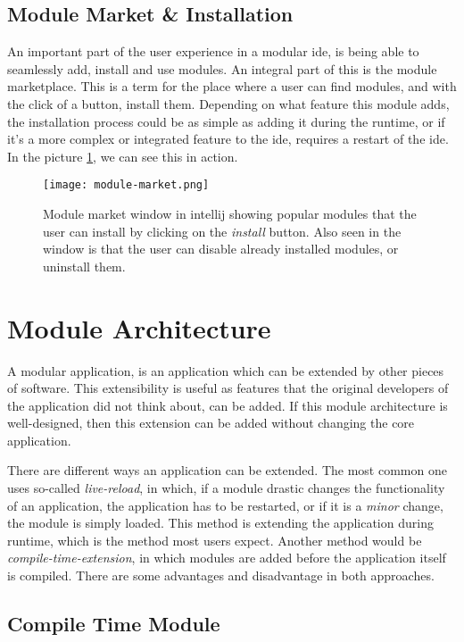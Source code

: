 \subsection{Module Market \& Installation}

An important part of the user experience in a modular \gls{ide}, is being able
to seamlessly add, install and use modules. An integral part of this is the
module marketplace. This is a term for the place where a user can find modules,
and with the click of a button, install them. Depending on what feature this
module adds, the installation process could be as simple as adding it during the
runtime, or if it's a more complex or integrated feature to the \gls{ide},
requires a restart of the \gls{ide}. In the picture \ref{pic:market}, we can see
this in action.

\begin{figure}
  \centering
  \texttt{[image: module-market.png]}
  \caption{
    Module market window in \gls{intellij} showing popular modules that the user can
    install by clicking on the \textit{install} button. Also seen in the window is
    that the user can disable already installed modules, or uninstall them.
  }
  \label{pic:market}
\end{figure}

\section{Module Architecture}

A modular application, is an application which can be extended by other pieces
of software. This extensibility is useful as features that the original
developers of the application did not think about, can be added. If this module
architecture is well-designed, then this extension can be added without changing
the core application.

There are different ways an application can be extended. The most common one
uses so-called \textit{live-reload}, in which, if a module drastic changes the
functionality of an application, the application has to be restarted, or if it
is a \textit{minor} change, the module is simply loaded. This method is
extending the application during runtime, which is the method most users
expect. Another method would be \textit{compile-time-extension}, in which
modules are added before the application itself is compiled. There are some
advantages and disadvantage in both approaches.

\subsection{Compile Time Module}

